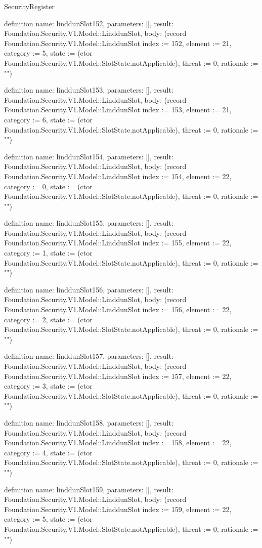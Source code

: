 \begin{lexlean}{SecurityRegister}
\begin{semanticmodule}
definition{
  name: linddunSlot152,
  parameters: [],
  result: Foundation.Security.V1.Model::LinddunSlot,
  body: (record Foundation.Security.V1.Model::LinddunSlot {index := 152, element := 21, category := 5, state := (ctor Foundation.Security.V1.Model::SlotState.notApplicable), threat := 0, rationale := ""})
}

definition{
  name: linddunSlot153,
  parameters: [],
  result: Foundation.Security.V1.Model::LinddunSlot,
  body: (record Foundation.Security.V1.Model::LinddunSlot {index := 153, element := 21, category := 6, state := (ctor Foundation.Security.V1.Model::SlotState.notApplicable), threat := 0, rationale := ""})
}

definition{
  name: linddunSlot154,
  parameters: [],
  result: Foundation.Security.V1.Model::LinddunSlot,
  body: (record Foundation.Security.V1.Model::LinddunSlot {index := 154, element := 22, category := 0, state := (ctor Foundation.Security.V1.Model::SlotState.notApplicable), threat := 0, rationale := ""})
}

definition{
  name: linddunSlot155,
  parameters: [],
  result: Foundation.Security.V1.Model::LinddunSlot,
  body: (record Foundation.Security.V1.Model::LinddunSlot {index := 155, element := 22, category := 1, state := (ctor Foundation.Security.V1.Model::SlotState.notApplicable), threat := 0, rationale := ""})
}

definition{
  name: linddunSlot156,
  parameters: [],
  result: Foundation.Security.V1.Model::LinddunSlot,
  body: (record Foundation.Security.V1.Model::LinddunSlot {index := 156, element := 22, category := 2, state := (ctor Foundation.Security.V1.Model::SlotState.notApplicable), threat := 0, rationale := ""})
}

definition{
  name: linddunSlot157,
  parameters: [],
  result: Foundation.Security.V1.Model::LinddunSlot,
  body: (record Foundation.Security.V1.Model::LinddunSlot {index := 157, element := 22, category := 3, state := (ctor Foundation.Security.V1.Model::SlotState.notApplicable), threat := 0, rationale := ""})
}

definition{
  name: linddunSlot158,
  parameters: [],
  result: Foundation.Security.V1.Model::LinddunSlot,
  body: (record Foundation.Security.V1.Model::LinddunSlot {index := 158, element := 22, category := 4, state := (ctor Foundation.Security.V1.Model::SlotState.notApplicable), threat := 0, rationale := ""})
}

definition{
  name: linddunSlot159,
  parameters: [],
  result: Foundation.Security.V1.Model::LinddunSlot,
  body: (record Foundation.Security.V1.Model::LinddunSlot {index := 159, element := 22, category := 5, state := (ctor Foundation.Security.V1.Model::SlotState.notApplicable), threat := 0, rationale := ""})
}


\end{semanticmodule}
\end{lexlean}
